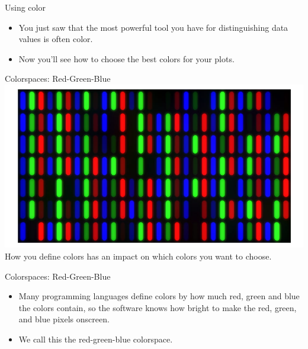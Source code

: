 \documentclass[
  ignorenonframetext,
]{beamer}
\begin{document}
\begin{frame}{Using color}
\label{using-color}
\begin{itemize}
\item
  You just saw that the most powerful tool you have for distinguishing
  data values is often color.
\item
  Now you'll see how to choose the best colors for your plots.
\end{itemize}
\end{frame}

\begin{frame}{Colorspaces: Red-Green-Blue}
\label{colorspaces-red-green-blue}
\includegraphics{../images/im75.png} How you define colors has an impact
on which colors you want to choose.
\end{frame}

\begin{frame}{Colorspaces: Red-Green-Blue}
\label{colorspaces-red-green-blue-1}
\begin{itemize}
\item
  Many programming languages define colors by how much red, green and
  blue the colors contain, so the software knows how bright to make the
  red, green, and blue pixels onscreen.
\item
  We call this the red-green-blue colorspace.
\end{itemize}
\end{frame}
\end{document}

